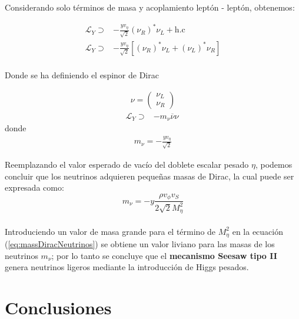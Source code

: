 \documentclass[12pt]{article}
\begin{document}
Considerando solo términos de masa y acoplamiento leptón - leptón, obtenemos:

\begin{align}
    \label{eq:Quarter}
    \mathcal{L}_Y \supset&
       -\frac{yv_\eta}{\sqrt{2}} (\nu_R)^* \nu_L+ \text{h.c} \nonumber\\
        \mathcal{L}_Y  \supset& -\frac{yv_\eta}{\sqrt{2}} [(\nu_R)^* \nu_L+(\nu_L)^* \nu_R]\nonumber\\
\end{align}

Donde se ha definiendo el espinor de Dirac

\begin{align}
\nu =\begin{pmatrix}
 \nu_L\\
 \nu_R
\end{pmatrix}
\end{align}
\begin{align}
    \label{eq:Fiveth}
    \mathcal{L}_Y \supset&
       -m_\nu \overline{\nu}\nu\nonumber\
\end{align}donde
\begin{align}
m_\nu=-\frac{yv_\eta}{\sqrt{2}} 
\end{align}

Reemplazando el valor esperado de vacío  del doblete escalar pesado $\eta$, podemos concluir que  los neutrinos adquieren pequeñas masas de Dirac, la cual puede ser expresada como:\\



 \begin{equation}
      \label{eq:massDiracNeutrinos}
      m_\nu   = -y \frac{ \rho v_\phi v_S }{2\sqrt{2}M^{2}_\eta}
 \end{equation} \\

Introduciendo un valor de masa grande para el término de \( M^{2}_\eta \) en la ecuación (\ref{eq:massDiracNeutrinos}) se obtiene un valor liviano para las masas de los neutrinos \(  m_\nu \); por lo tanto se concluye que el \textbf{mecanismo Seesaw tipo II} genera neutrinos ligeros mediante la introducción de Higgs pesados. \\



\section{Conclusiones}
\end{document}
